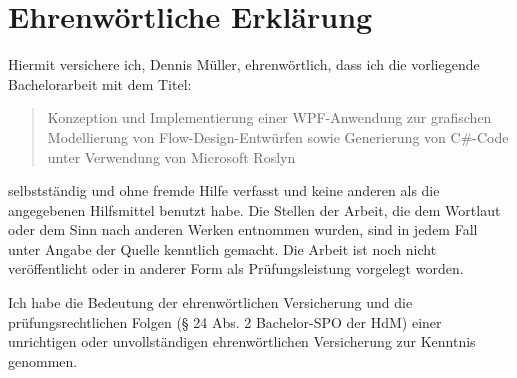 
\chapter*{Ehrenwörtliche Erklärung}

Hiermit versichere ich, Dennis Müller, ehrenwörtlich, dass ich die vorliegende Bachelorarbeit  mit dem Titel: 

\begin{quote}
	Konzeption und Implementierung einer WPF-Anwendung zur grafischen
	Modellierung von Flow-Design-Entwürfen sowie Generierung von
	C\#-Code unter Verwendung von Microsoft Roslyn
\end{quote}


selbstständig und ohne fremde Hilfe verfasst und keine anderen als die angegebenen Hilfsmittel benutzt habe. Die Stellen der Arbeit, die dem Wortlaut oder dem Sinn nach anderen Werken entnommen wurden, sind in jedem Fall unter Angabe der Quelle kenntlich gemacht. Die Arbeit ist noch nicht veröffentlicht oder in anderer Form als Prüfungsleistung vorgelegt worden.

\vspace{0.5cm}

Ich habe die Bedeutung der ehrenwörtlichen Versicherung und die prüfungsrechtlichen Folgen (§ 24 Abs. 2 Bachelor-SPO der HdM) einer unrichtigen oder unvollständigen ehrenwörtlichen Versicherung zur Kenntnis genommen.
\vspace{1.5cm}




